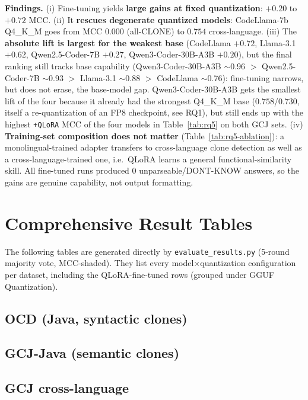 \documentclass[11pt]{article}
\begin{document}
\noindent\textbf{Findings.} (i) Fine-tuning yields \textbf{large gains at fixed
quantization}: $+0.20$ to $+0.72$ MCC. (ii) It \textbf{rescues degenerate
quantized models}: CodeLlama-7b Q4\_K\_M goes from MCC $0.000$ (all-CLONE) to
$0.754$ cross-language. (iii) The \textbf{absolute lift is largest for the
weakest base} (CodeLlama $+0.72$, Llama-3.1 $+0.62$, Qwen2.5-Coder-7B $+0.27$,
Qwen3-Coder-30B-A3B $+0.20$), but the final ranking still tracks base
capability (Qwen3-Coder-30B-A3B $\sim$0.96 $>$ Qwen2.5-Coder-7B $\sim$0.93
$>$ Llama-3.1 $\sim$0.88 $>$ CodeLlama $\sim$0.76): fine-tuning narrows, but
does not erase, the base-model gap. Qwen3-Coder-30B-A3B gets the smallest
lift of the four because it already had the strongest Q4\_K\_M base
($0.758$/$0.730$, itself a re-quantization of an FP8 checkpoint, see RQ1), but
still ends up with the highest \texttt{+QLoRA} MCC of the four models in
Table~\ref{tab:rq5} on both GCJ sets. (iv) \textbf{Training-set composition
does not matter}
(Table~\ref{tab:rq5-ablation}): a monolingual-trained adapter transfers to
cross-language clone detection as well as a cross-language-trained one, i.e.\
QLoRA learns a general functional-similarity skill. All fine-tuned runs produced
0 unparseable/DONT-KNOW answers, so the gains are genuine capability, not output
formatting.

\section{Comprehensive Result Tables}
\label{sec:fulltables}
The following tables are generated directly by \texttt{evaluate_results.py}
(5-round majority vote, MCC-shaded). They list every model$\times$quantization
configuration per dataset, including the QLoRA-fine-tuned rows (grouped under
GGUF Quantization).

\subsection{OCD (Java, syntactic clones)}


\subsection{GCJ-Java (semantic clones)}


\subsection{GCJ cross-language}

\end{document}
